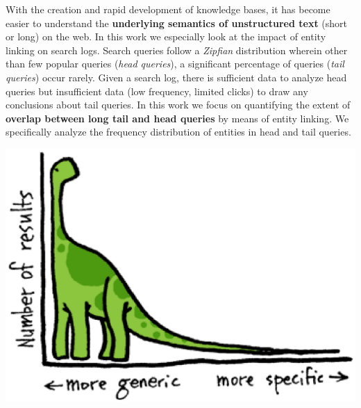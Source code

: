 \documentclass[a0,portrait,final]{a0poster}
\begin{document}
\vfill
\large


\begin{multicols}{2}
	
	With the creation and rapid development of knowledge bases, it has become easier
	 to understand the \textbf{underlying semantics of unstructured text} (short or long) on the web.  
	 In this work we especially look at the impact of entity linking on search logs. 
	 Search queries follow a \emph{Zipfian} distribution wherein other than few popular queries 
	 (\emph{head queries}), a significant percentage of queries (\emph{tail queries}) occur rarely. 
	 Given a search log, there is sufficient data to analyze head queries but insufficient 
	 data (low frequency, limited clicks) to draw any conclusions about tail queries. 
	 In this work we focus on quantifying the extent of \textbf{overlap between long tail
	 	 and head queries} by means of entity linking. We specifically analyze the 
	 frequency distribution of entities in head and tail queries. 
	
	 
	  \vspace{10mm}
	  \begin{center}
	  \includegraphics[width=0.9\columnwidth]{img/long-tail.eps}
	  \end{center}
	  

\end{multicols}
\end{document}
